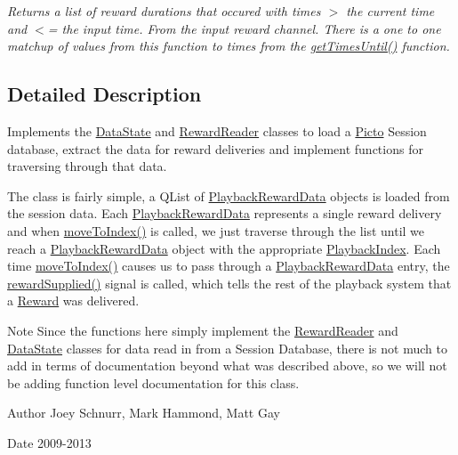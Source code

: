 \begin{DoxyCompactItemize}
\begin{DoxyCompactList}\small\item\em Returns a list of reward durations that occured with times $>$ the current time and $<$= the input time. From the input reward channel. There is a one to one matchup of values from this function to times from the \hyperlink{class_picto_1_1_reward_state_a32737cd71bb1dacc99211ef78fc943d2}{get\-Times\-Until()} function. \end{DoxyCompactList}\end{DoxyCompactItemize}


\subsection{Detailed Description}
Implements the \hyperlink{class_picto_1_1_data_state}{Data\-State} and \hyperlink{class_picto_1_1_reward_reader}{Reward\-Reader} classes to load a \hyperlink{namespace_picto}{Picto} Session database, extract the data for reward deliveries and implement functions for traversing through that data. 

The class is fairly simple, a Q\-List of \hyperlink{struct_picto_1_1_playback_reward_data}{Playback\-Reward\-Data} objects is loaded from the session data. Each \hyperlink{struct_picto_1_1_playback_reward_data}{Playback\-Reward\-Data} represents a single reward delivery and when \hyperlink{class_picto_1_1_reward_state_a784e710cbd93bbc245a276b691326b12}{move\-To\-Index()} is called, we just traverse through the list until we reach a \hyperlink{struct_picto_1_1_playback_reward_data}{Playback\-Reward\-Data} object with the appropriate \hyperlink{struct_picto_1_1_playback_index}{Playback\-Index}. Each time \hyperlink{class_picto_1_1_reward_state_a784e710cbd93bbc245a276b691326b12}{move\-To\-Index()} causes us to pass through a \hyperlink{struct_picto_1_1_playback_reward_data}{Playback\-Reward\-Data} entry, the \hyperlink{class_picto_1_1_reward_state_a1d10829fe64ff324aba508d04931759d}{reward\-Supplied()} signal is called, which tells the rest of the playback system that a \hyperlink{class_picto_1_1_reward}{Reward} was delivered.

\begin{DoxyNote}{Note}
Since the functions here simply implement the \hyperlink{class_picto_1_1_reward_reader}{Reward\-Reader} and \hyperlink{class_picto_1_1_data_state}{Data\-State} classes for data read in from a Session Database, there is not much to add in terms of documentation beyond what was described above, so we will not be adding function level documentation for this class. 
\end{DoxyNote}
\begin{DoxyAuthor}{Author}
Joey Schnurr, Mark Hammond, Matt Gay 
\end{DoxyAuthor}
\begin{DoxyDate}{Date}
2009-\/2013 
\end{DoxyDate}


